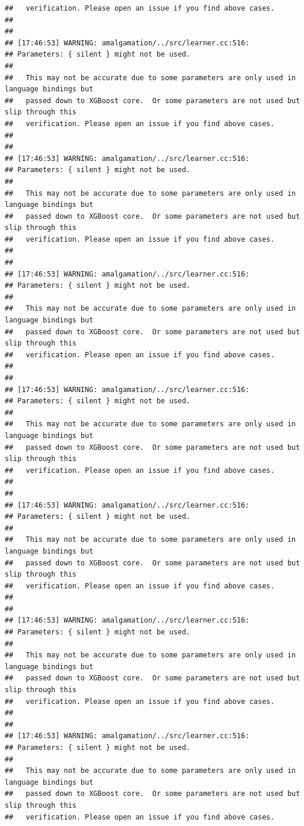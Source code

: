 \documentclass[AMS,STIX2COL]{WileyNJD-v2}\usepackage[]{graphicx}\usepackage[]{color}
\makeatletter
\newenvironment{kframe}{%
 \def\at@end@of@kframe{}%
 \ifinner\ifhmode%
  \def\at@end@of@kframe{\end{minipage}}%
  \begin{minipage}{\columnwidth}%
 \fi\fi%
 \def\FrameCommand##1{\hskip\@totalleftmargin \hskip-\fboxsep
 \colorbox{shadecolor}{##1}\hskip-\fboxsep
     \hskip-\linewidth \hskip-\@totalleftmargin \hskip\columnwidth}%
 \MakeFramed {\advance\hsize-\width
   \@totalleftmargin\z@ \linewidth\hsize
   \@setminipage}}%
 {\par\unskip\endMakeFramed%
 \at@end@of@kframe}
\newenvironment{knitrout}{}{} %
\makeatother
\begin{document}
\begin{knitrout}
\begin{kframe}
\begin{verbatim}
##   verification. Please open an issue if you find above cases.
## 
## 
## [17:46:53] WARNING: amalgamation/../src/learner.cc:516: 
## Parameters: { silent } might not be used.
## 
##   This may not be accurate due to some parameters are only used in language bindings but
##   passed down to XGBoost core.  Or some parameters are not used but slip through this
##   verification. Please open an issue if you find above cases.
## 
## 
## [17:46:53] WARNING: amalgamation/../src/learner.cc:516: 
## Parameters: { silent } might not be used.
## 
##   This may not be accurate due to some parameters are only used in language bindings but
##   passed down to XGBoost core.  Or some parameters are not used but slip through this
##   verification. Please open an issue if you find above cases.
## 
## 
## [17:46:53] WARNING: amalgamation/../src/learner.cc:516: 
## Parameters: { silent } might not be used.
## 
##   This may not be accurate due to some parameters are only used in language bindings but
##   passed down to XGBoost core.  Or some parameters are not used but slip through this
##   verification. Please open an issue if you find above cases.
## 
## 
## [17:46:53] WARNING: amalgamation/../src/learner.cc:516: 
## Parameters: { silent } might not be used.
## 
##   This may not be accurate due to some parameters are only used in language bindings but
##   passed down to XGBoost core.  Or some parameters are not used but slip through this
##   verification. Please open an issue if you find above cases.
## 
## 
## [17:46:53] WARNING: amalgamation/../src/learner.cc:516: 
## Parameters: { silent } might not be used.
## 
##   This may not be accurate due to some parameters are only used in language bindings but
##   passed down to XGBoost core.  Or some parameters are not used but slip through this
##   verification. Please open an issue if you find above cases.
## 
## 
## [17:46:53] WARNING: amalgamation/../src/learner.cc:516: 
## Parameters: { silent } might not be used.
## 
##   This may not be accurate due to some parameters are only used in language bindings but
##   passed down to XGBoost core.  Or some parameters are not used but slip through this
##   verification. Please open an issue if you find above cases.
## 
## 
## [17:46:53] WARNING: amalgamation/../src/learner.cc:516: 
## Parameters: { silent } might not be used.
## 
##   This may not be accurate due to some parameters are only used in language bindings but
##   passed down to XGBoost core.  Or some parameters are not used but slip through this
##   verification. Please open an issue if you find above cases.

\end{verbatim}
\end{kframe}
\end{knitrout}
\end{document}
